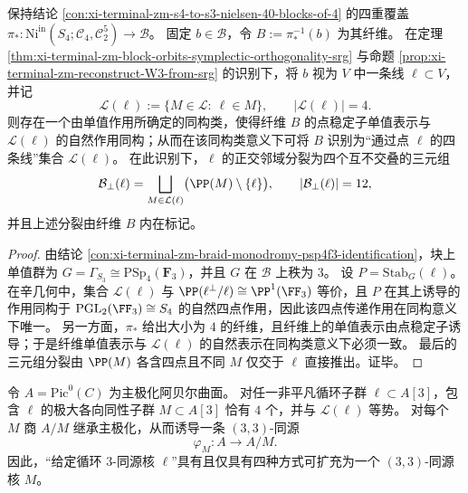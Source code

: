 \begin{theorem}\label{thm:xi-terminal-zm-pistar-fiber-equals-four-lines-through-point}
保持结论 \ref{con:xi-terminal-zm-s4-to-s3-nielsen-40-blocks-of-4} 的四重覆盖
\(
\pi_*:\mathrm{Ni}^{\mathrm{in}}(S_4;\mathcal C_4,\mathcal C_2^5)\to \mathcal B
\)。
固定 \(b\in\mathcal B\)，令 \(B:=\pi_*^{-1}(b)\) 为其纤维。
在定理 \ref{thm:xi-terminal-zm-block-orbits-symplectic-orthogonality-srg} 与命题 \ref{prop:xi-terminal-zm-reconstruct-W3-from-srg} 的识别下，将 \(b\) 视为 \(V\) 中一条线 \(\ell\subset V\)，并记
\[
\mathcal L(\ell):=\{M\in\mathcal L:\ \ell\in M\},
\qquad |\mathcal L(\ell)|=4.
\]
则存在一个由单值作用所确定的同构类，使得纤维 \(B\) 的点稳定子单值表示与 \(\mathcal L(\ell)\) 的自然作用同构；从而在该同构类意义下可将 \(B\) 识别为“通过点 \(\ell\) 的四条线”集合 \(\mathcal L(\ell)\)。
在此识别下，\(\ell\) 的正交邻域分裂为四个互不交叠的三元组
\[
\mathcal B_\perp(\ell)
=
\bigsqcup_{M\in\mathcal L(\ell)}\bigl(\PP(M)\setminus\{\ell\}\bigr),
\qquad |\mathcal B_\perp(\ell)|=12,
\]
并且上述分裂由纤维 \(B\) 内在标记。
\end{theorem}

\begin{proof}
由结论 \ref{con:xi-terminal-zm-braid-monodromy-psp4f3-identification}，块上单值群为 \(G=\Gamma_{S_3}\cong \mathrm{PSp}_4(\mathbf F_3)\)，并且 \(G\) 在 \(\mathcal B\) 上秩为 \(3\)。
设 \(P=\mathrm{Stab}_G(\ell)\)。
在辛几何中，集合 \(\mathcal L(\ell)\) 与 \(\PP(\ell^\perp/\ell)\cong \PP^1(\FF_3)\) 等价，且 \(P\) 在其上诱导的作用同构于 \(\mathrm{PGL}_2(\FF_3)\cong S_4\) 的自然四点作用，因此该四点传递作用在同构意义下唯一。
另一方面，\(\pi_*\) 给出大小为 \(4\) 的纤维，且纤维上的单值表示由点稳定子诱导；于是纤维单值表示与 \(\mathcal L(\ell)\) 的自然表示在同构类意义下必须一致。
最后的三元组分裂由 \(\PP(M)\) 各含四点且不同 \(M\) 仅交于 \(\ell\) 直接推出。证毕。
\end{proof}

\begin{corollary}\label{cor:xi-terminal-zm-cyclic3-to-33-isogeny-four-extensions}
令 \(A=\mathrm{Pic}^0(C)\) 为主极化阿贝尔曲面。
对任一非平凡循环子群 \(\ell\subset A[3]\)，包含 \(\ell\) 的极大各向同性子群 \(M\subset A[3]\) 恰有 \(4\) 个，并与 \(\mathcal L(\ell)\) 等势。
对每个 \(M\) 商 \(A/M\) 继承主极化，从而诱导一条 \((3,3)\)-同源
\[
\varphi_M:A\to A/M.
\]
因此，“给定循环 \(3\)-同源核 \(\ell\)”具有且仅具有四种方式可扩充为一个 \((3,3)\)-同源核 \(M\)。
\end{corollary}

